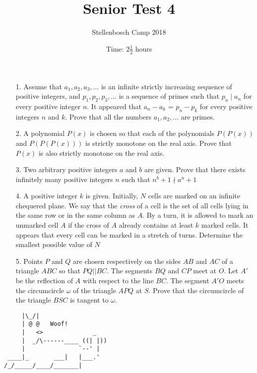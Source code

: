 \documentclass[a4paper, 12pt]{article}
\title{Senior Test 4}
\author{Stellenbosch Camp 2018}
\date{Time: $2 \frac{1}{2}$ hours}
\begin{document}
 \maketitle

\begin{enumerate}
\item[1.]Assume that $a_1,a_2,a_3,...$ is an infinite strictly increasing sequence of positive integers, and $p_1,p_2,p_3,...$ is a sequence of primes such that $p_n \mid a_n$ for every positive integer $n$. It appeared that $a_n - a_k$ = $p_n - p_k$ for every positive integers $n$ and $k$. Prove that all the numbers $a_1,a_2,...$ are primes.
\vspace{7pt}

\item[2.]A polynomial $P(x)$ is chosen so that each of the polynomials $P(P(x)) $ and $P(P(P(x))) $ is strictly monotone on the real axis. Prove that $P(x)$ is also strictly monotone on the real axis.
\vspace{7pt}

\item[3.]Two arbitrary positive integers $a$ and $b$ are given. Prove that there exists infinitely many positive integers $n$ such that $n^b +1 \nmid a^n +1$

\vspace{5pt}

\item[4.]A positive integer $k$ is given. Initially, $N$ cells are marked on an infinite chequered plane. We say that the \textit{cross} of a cell is the set of all cells lying in the same row or in the same column as $A$. By a turn, it is allowed to mark an unmarked cell $A$ if the cross of $A$ already contains at least $k$ marked cells. It appears that every cell can be marked in a stretch of turns. Determine the smallest possible value of $N$
\vspace{7pt}

\item[5.]Points $P$ and $Q$ are chosen respectively on the sides $AB$ and $AC$ of a triangle $ABC$ so that $PQ||BC$. The segments $BQ$ and $CP$ meet at $O$. Let $A'$ be the reflection of $A$ with respect to the line $BC$. The segment $A'O$ meets the circumcircle $\omega$ of the triangle $APQ$ at $S$. Prove that the circumcircle of the triangle $BSC$ is tangent to $\omega$.
\vspace{7pt}


\end{enumerate}

\vfill

\centering
\begin{BVerbatim}
     |\_/|                  
     | @ @   Woof! 
     |   <>              _  
     |  _/\------____ ((| |))
     |               `--' |   
 ____|_       ___|   |___.' 
/_/_____/____/_______|
\end{BVerbatim}

\vspace{12mm}
\end{document}
